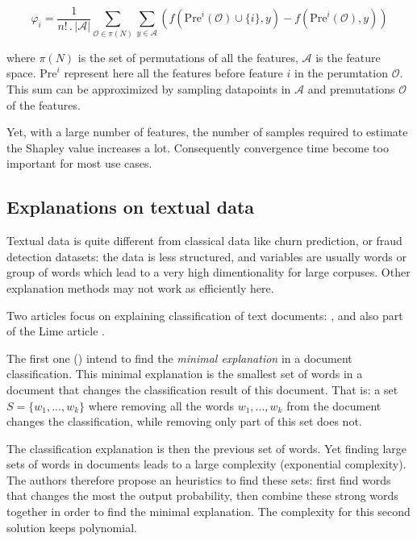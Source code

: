 \documentclass[a4paper,11pt]{kth-mag}
\begin{document}
\[
	\varphi_i = \frac1{n! \, . \, | \mathcal{A} |} \sum_{\mathcal{O} \in \pi(N)} \sum_{y \in \mathcal{A}} \left( f( \mathrm{Pre}^i(\mathcal{O}) \cup \{i\}, y) - f(\mathrm{Pre}^i(\mathcal{O}), y) \right)
\]

where $\pi(N)$ is the set of permutations of all the features, $\mathcal{A}$ is the feature space. $\mathrm{Pre}^i$ represent here all the features before feature $i$ in the perumtation $\mathcal{O}$. This sum can be approximized by sampling datapoints in $\mathcal{A}$ and premutations $\mathcal{O}$ of the features.

Yet, with a large number of features, the number of samples required to estimate the Shapley value increases a lot. Consequently convergence time become too important for most use cases.

\subsection{Explanations on textual data}

Textual data is quite different from classical data like churn prediction, or fraud detection datasets: the data is less structured, and variables are usually words or group of words which lead to a very high dimentionality for large corpuses. Other explanation methods may not work as efficiently here.

Two articles focus on explaining classification of text documents:  \cite{documentclassif}, and also part of the Lime article \cite{lime}.

The first one (\cite{documentclassif}) intend to find the \textit{minimal explanation} in a document classification. This minimal explanation is the smallest set of words in a document that changes the classification result of this document. That is: a set $S = \{w_1, ..., w_k\}$ where removing all the words $w_1, ..., w_k$ from the document changes the classification, while removing only part of this set does not.

The classification explanation is then the previous set of words. Yet finding large sets of words in documents leads to a large complexity (exponential complexity). The authors therefore propose an heuristics to find these sets: first find words that changes the most the output probability, then combine these strong words together in order to find the minimal explanation. The complexity for this second solution keeps polynomial.

\vspace{\baselineskip}
\end{document}
